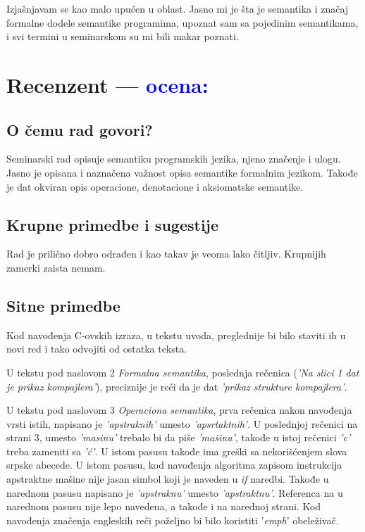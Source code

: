 \documentclass[a4paper]{report}
\newcommand{\odgovor}[1]{\textcolor{blue}{#1}}
\begin{document}
Izjašnjavam se kao malo upućen u oblast. Jasno mi je šta je semantika i značaj formalne dodele semantike programima, upoznat sam sa pojedinim semantikama, i
svi termini u seminarskom su mi bili makar poznati.  


\chapter{Recenzent \odgovor{--- ocena:} }


\section{O čemu rad govori?}
Seminarski rad opisuje semantiku programskih jezika, njeno značenje i ulogu. Jasno je opisana i naznačena važnost opisa semantike formalnim jezikom. Takođe je dat okviran opis operacione, denotacione i aksiomatske semantike. 

\section{Krupne primedbe i sugestije}

Rad je prilično dobro odrađen i kao takav je veoma lako čitljiv. Krupnijih zamerki zaista nemam.

\section{Sitne primedbe}
Kod navođenja C-ovskih izraza, u tekstu uvoda, preglednije bi bilo staviti ih u novi red i tako odvojiti od ostatka teksta. 

U tekstu pod naslovom 2 \emph{Formalna semantika}, poslednja rečenica (\emph{'Na slici 1 dat je prikaz kompajlera'}), preciznije je reći da je dat \emph{'prikaz strukture kompajlera'}.

U tekstu pod naslovom 3 \emph{Operaciona semantika}, prva rečenica nakon navođenja vrsti istih, napisano je \emph{'apstraknih'} umesto \emph{'apsrtaktnih'}. U poslednjoj rečenici na strani 3, umesto \emph{'masinu'} trebalo bi da piše \emph{'mašinu'}, takođe u istoj rečenici \emph{'c'} treba zameniti sa \emph{'ć'}. U istom pasusu takođe ima greški sa nekorišćenjem slova srpske abecede. U istom pasusu, kod navođenja algoritma zapisom instrukcija apstraktne mašine nije jasan simbol koji je naveden u \emph{if} naredbi. Takođe u narednom pasusu napisano je \emph{'apstraknu'} umesto \emph{'apstraktnu'}. Referenca na u narednom pasusu nije lepo navedena, a takođe i na narednoj strani. Kod navođenja značenja engleskih reči poželjno bi bilo koristiti '\emph{emph}' obeleživač.
\end{document}
